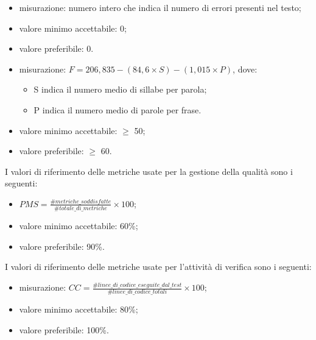 			\begin{itemize}
				\item{misurazione: numero intero che indica il numero di errori presenti nel testo;}
				\item{valore minimo accettabile: 0;}
				\item{valore preferibile: 0.}
			\end{itemize}
		
			 \begin{itemize}
				\item{misurazione: $ F = 206,835 - (84,6 \times S) - (1,015 \times P) $, dove: 
				\begin{itemize}
					\item S indica il numero medio di sillabe per parola; 
					\item P indica il numero medio di parole per frase. 
				\end{itemize}}
				\item{valore minimo accettabile: $\geq$ 50;}
				\item{valore preferibile: $\geq$ 60.}
			\end{itemize}

	I valori di riferimento delle metriche usate per la gestione della qualità sono i seguenti:
	
			\begin{itemize}
				\item{$PMS=\displaystyle\frac{\#metriche\_soddisfatte}{\#totale\_di\_metriche} \times 100$;}
				\item{valore minimo accettabile: 60\%;}
				\item{valore preferibile: 90\%.}
			\end{itemize}
					
	I valori di riferimento delle metriche usate per l'attività di verifica sono i seguenti:
	
		 	\begin{itemize}
				\item{misurazione: $ CC = \displaystyle\frac{\#linee\_di\_codice\_eseguite\_dal\_test}{\#linee\_di\_codice\_totali} \times 100$;}
				\item{valore minimo accettabile: 80\%;}
				\item{valore preferibile: 100\%.}
			\end{itemize}

